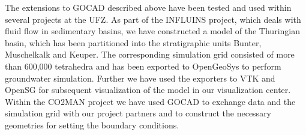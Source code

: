 The extensions to GOCAD described above have been tested and used within several projects at the UFZ. As part of the INFLUINS project, which deals with fluid flow in sedimentary basins, we have constructed a model of the Thuringian basin, which has been partitioned into the stratigraphic units Bunter, Muschelkalk and Keuper. The corresponding simulation grid consisted of more than 600,000 tetrahedra and has been exported to OpenGeoSys to perform groundwater simulation. Further we have used the exporters to VTK and OpenSG for subsequent visualization of the model in our visualization center. Within the CO2MAN project we have used GOCAD to exchange data and the simulation grid with our project partners and to construct the necessary geometries for setting the boundary conditions.